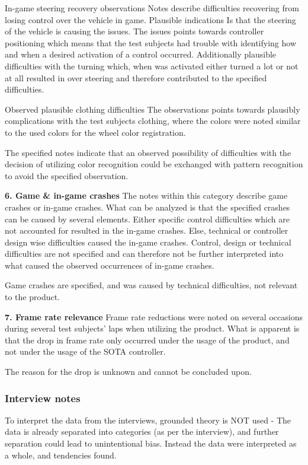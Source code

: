  In-game steering recovery observations\newline
Notes describe difficulties recovering from losing control over the vehicle in game. 
Plausible indications Is that the steering of the vehicle is causing the issues. 
The issues points towards controller positioning which means that the test subjects had trouble with identifying how and when a desired activation of a control occurred. 
Additionally plausible difficulties with the turning which, when was activated either turned a lot or not at all resulted in over steering and therefore contributed to the specified difficulties.  
\bigskip

 Observed plausible clothing difficulties\newline
The observations points towards plausibly complications with the test subjects clothing, where the colors were noted similar to the used colors for the wheel color registration. 
\bigskip

The specified notes indicate that an observed possibility of difficulties with the decision of utilizing color recognition could be exchanged with pattern recognition to avoid the specified observation.
\bigskip

\noindent\textbf{6. Game \& in-game crashes}\newline
The notes within this category describe game crashes or in-game crashes. What can be analyzed is that the specified crashes can be caused by several elements.
Either specific control difficulties which are not accounted for resulted in the in-game crashes. 
Else, technical or controller design wise difficulties caused the in-game crashes. Control, design or technical difficulties are not specified and can therefore not be further interpreted into what caused the observed occurrences of in-game crashes.

Game crashes are specified, and was caused by technical difficulties, not relevant to the product.
\bigskip

\noindent\textbf{7. Frame rate relevance}\newline
Frame rate reductions were noted on several occasions during several test subjects’ laps when utilizing the product. 
What is apparent is that the drop in frame rate only occurred under the usage of the product, and not under the usage of the SOTA controller.

The reason for the drop is unknown and cannot be concluded upon.

\subsubsection{Interview notes}
To interpret the data from the interviews, grounded theory is NOT used - The data is already separated into categories (as per the interview), and further separation could lead to unintentional bias. 
Instead the data were interpreted as a whole, and tendencies found.

